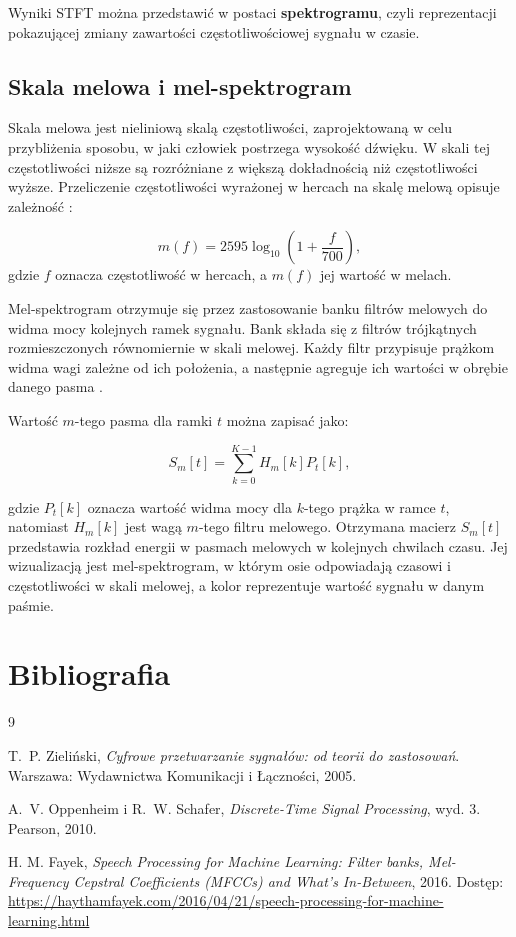 \documentclass[12pt, a4paper]{article}
\theoremstyle{definition}
\theoremstyle{plain}
\theoremstyle{remark}
\begin{document}
Wyniki STFT można przedstawić w postaci \textbf{spektrogramu}, czyli reprezentacji pokazującej zmiany zawartości częstotliwościowej sygnału w czasie.

\subsection{Skala melowa i mel-spektrogram}

Skala melowa jest nieliniową skalą częstotliwości, zaprojektowaną w celu przybliżenia sposobu, w jaki człowiek postrzega wysokość dźwięku. W skali tej częstotliwości niższe są rozróżniane z większą dokładnością niż częstotliwości wyższe. Przeliczenie częstotliwości wyrażonej w hercach na skalę melową opisuje zależność \cite{fayek2016}:

\begin{equation}
    m(f) = 2595 \log_{10}\left(1+\frac{f}{700}\right),
\end{equation}
gdzie $f$ oznacza częstotliwość w hercach, a $m(f)$ jej wartość w melach.

Mel-spektrogram otrzymuje się przez zastosowanie banku filtrów melowych do widma mocy kolejnych ramek sygnału. Bank składa się z filtrów trójkątnych rozmieszczonych równomiernie w skali melowej. Każdy filtr przypisuje prążkom widma wagi zależne od ich położenia, a następnie agreguje ich wartości w obrębie danego pasma \cite{fayek2016}.

Wartość $m$-tego pasma dla ramki $t$ można zapisać jako:

\begin{equation}
    S_m[t] = \sum_{k=0}^{K-1} H_m[k]P_t[k],
\end{equation}

gdzie $P_t[k]$ oznacza wartość widma mocy dla $k$-tego prążka w ramce $t$, natomiast $H_m[k]$ jest wagą $m$-tego filtru melowego. Otrzymana macierz $S_m[t]$ przedstawia rozkład energii w pasmach melowych w kolejnych chwilach czasu. Jej wizualizacją jest mel-spektrogram, w którym osie odpowiadają czasowi i częstotliwości w skali melowej, a kolor reprezentuje wartość sygnału w danym paśmie.

\newpage
\section*{Bibliografia}

\begin{thebibliography}{9}

T.~P. Zieliński,
\textit{Cyfrowe przetwarzanie sygnałów: od teorii do zastosowań}.
Warszawa: Wydawnictwa Komunikacji i Łączności, 2005.

A.~V. Oppenheim i R.~W. Schafer,
\textit{Discrete-Time Signal Processing},
wyd. 3. Pearson, 2010.

H. M. Fayek, \textit{Speech Processing for Machine Learning: Filter banks, Mel-Frequency Cepstral Coefficients (MFCCs) and What's In-Between}, 2016.
Dostęp: \url{https://haythamfayek.com/2016/04/21/speech-processing-for-machine-learning.html}

\end{thebibliography}
\end{document}
